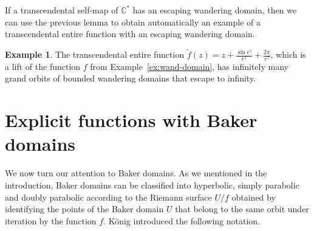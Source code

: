 \documentclass[a4paper, 12pt, reqno]{amsart}
\numberwithin{equation}{section}
\theoremstyle{plain}
\theoremstyle{definition}
\newtheorem{dfn}[thm]{Definition}
\newtheorem{ex}[thm]{Example}
\theoremstyle{remark}
\newcommand{\C}{{\mathbb{C}}}
\begin{document}
If a transcendental self-map of $\C^*$ has an escaping wandering domain, then we can use the previous lemma to obtain automatically an example of a transcendental entire function with an escaping wandering domain.

\begin{ex}
The transcendental entire function $\tilde{f}(z)=z+\frac{\sin e^z}{e^z}+\frac{2\pi}{e^z}$, which is a lift of the function $f$ from Example~\ref{ex:wand-domain}, has infinitely many grand orbits of bounded wandering domains that escape to infinity.
\end{ex}


 

\section{Explicit functions with Baker domains}

\label{sec:explicit-bd}


We now turn our attention to Baker domains. As we mentioned in the introduction, Baker domains can be classified into hyperbolic, simply parabolic and doubly parabolic according to the Riemann surface $U/f$ obtained by identifying the points of the Baker domain $U$ that belong to the same orbit under iteration by the function $f$. K\"onig \cite{koenig99} introduced the following notation.
\end{document}
